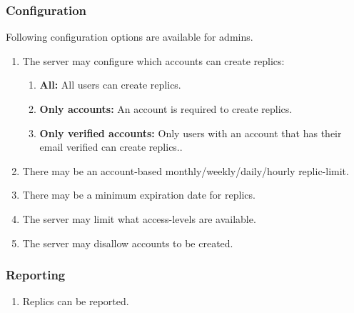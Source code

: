 \subsubsection{Configuration}
Following configuration options are available for admins.
\begin{enumerate}[label=\textit{AC \arabic*}, resume]
    \item \label{ac:config:1} The server may configure which accounts can create replics: \begin{enumerate}
                                                                                              \item \textbf{All:} All users can create replics.
                                                                                              \item \textbf{Only accounts:} An account is required to create replics.
                                                                                              \item \textbf{Only verified accounts:} Only users with an account that has their email verified can create replics..
    \end{enumerate}
    \item \label{ac:config:2} There may be an account-based monthly/weekly/daily/hourly replic-limit.
    \item \label{ac:config:3} There may be a minimum expiration date for replics.
    \item \label{ac:config:4} The server may limit what access-levels are available.
    \item \label{ac:config:5} The server may disallow accounts to be created.
\end{enumerate}

\subsubsection{Reporting}
\begin{enumerate}[label=\textit{AC \arabic*}, resume]
    \item \label{ac:reports:1} Replics can be reported.
\end{enumerate}

